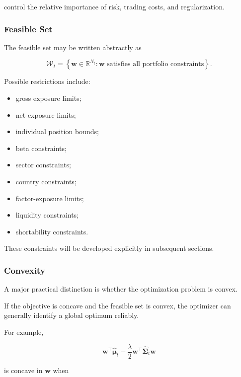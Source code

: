 \documentclass[11pt,a4paper]{article}
\begin{document}
control the relative importance of risk, trading costs, and regularization.


\subsubsection{Feasible Set}

The feasible set may be written abstractly as

\begin{equation}
\boxed{
\mathcal{W}_t
=
\left\{
\mathbf{w}\in\mathbb{R}^{N_t}
:
\mathbf{w}
\text{ satisfies all portfolio constraints}
\right\}.
}
\end{equation}

Possible restrictions include:

\begin{itemize}
    \item gross exposure limits;
    \item net exposure limits;
    \item individual position bounds;
    \item beta constraints;
    \item sector constraints;
    \item country constraints;
    \item factor-exposure limits;
    \item liquidity constraints;
    \item shortability constraints.
\end{itemize}

These constraints will be developed explicitly in subsequent sections.


\subsubsection{Convexity}

A major practical distinction is whether the optimization problem is convex.

If the objective is concave and the feasible set is convex, the optimizer can
generally identify a global optimum reliably.

For example,

\begin{equation}
\mathbf{w}^{\top}
\widehat{\boldsymbol{\mu}}_t
-
\frac{\lambda}{2}
\mathbf{w}^{\top}
\widehat{\boldsymbol{\Sigma}}_t
\mathbf{w}
\end{equation}

is concave in $\mathbf{w}$ when
\end{document}
